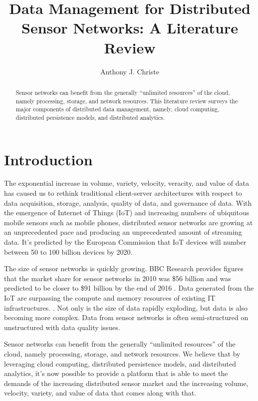 \documentclass[]{article}
\title{Data Management for Distributed Sensor Networks: A Literature Review}
\author{Anthony J. Christe}
\begin{document}
\maketitle


\begin{abstract}
    Sensor networks can benefit from the generally ``unlimited resources'' of the cloud, namely processing, storage, and network resources. This literature review surveys the major components of distributed data management, namely, cloud computing, distributed persistence models, and distributed analytics.
\end{abstract}

\pagebreak

\tableofcontents
\listoffigures
\pagebreak

\section{Introduction} \label{sec:introduction}
The exponential increase in volume, variety, velocity, veracity, and value of data has caused us to rethink traditional client-server architectures with respect to data acquisition, storage, analysis, quality of data, and governance of data. With the emergence of Internet of Things (IoT) and increasing numbers of ubiquitous mobile sensors such as mobile phones, distributed sensor networks are growing at an unprecedented pace and producing an unprecedented amount of streaming data. It's predicted by the European Commission that IoT devices will number between 50 to 100 billion devices by 2020\cite{6072197}.

The size of sensor networks is quickly growing. BBC Research provides figures that the market share for sensor networks in 2010 was \$56 billion and was predicted to be closer to \$91 billion by the end of 2016 \cite{zaslavsky_sensing_2013}. Data generated from the IoT are surpassing the compute and memory resources of existing IT infrastructures. \cite{chen_big_2014}. Not only is the size of data rapidly exploding, but data is also becoming more complex. Data from sensor networks is often semi-structured on unstructured with data quality issues. 

Sensor networks can benefit from the generally ``unlimited resources'' of the cloud, namely processing, storage, and network resources. We believe that by leveraging cloud computing, distributed persistence models, and distributed analytics, it's now possible to provide a platform that is able to meet the demands of the increasing distributed sensor market and the increasing volume, velocity, variety, and value of data that comes along with that. 
\end{document}
